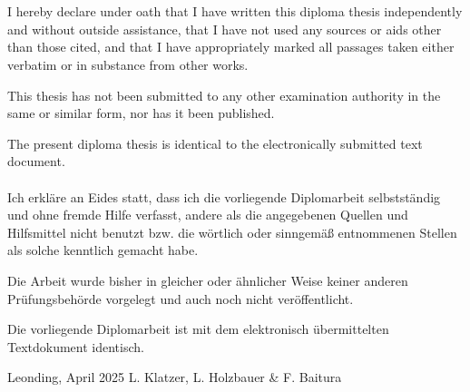 \thispagestyle{empty}
\vspace{3cm}
~ \\ \\
I hereby declare under oath that I have written this diploma thesis independently and without outside assistance, that I have not used any sources or aids other than those cited, and that I have appropriately marked all passages taken either verbatim or in substance from other works.

This thesis has not been submitted to any other examination authority in the same or similar form, nor has it been published.

The present diploma thesis is identical to the electronically submitted text document.
\vspace{1cm}
~ \\ \\
Ich erkläre an Eides statt, dass ich die vorliegende Diplomarbeit selbstständig und ohne fremde Hilfe verfasst, andere als die angegebenen Quellen und Hilfsmittel nicht benutzt bzw. die wörtlich oder sinngemäß entnommenen Stellen als solche kenntlich gemacht habe.

Die Arbeit wurde bisher in gleicher oder ähnlicher Weise keiner anderen Prüfungsbehörde vorgelegt und auch noch nicht veröffentlicht.

Die vorliegende Diplomarbeit ist mit dem elektronisch übermittelten Textdokument identisch.
\vspace{3cm}
\begin{tabbing}
	Leonding, April 2025 \hspace{5cm} L. Klatzer, L. Holzbauer \& F. Baitura
\end{tabbing}
\vspace{5cm}
\newpage
\setcounter{page}{1}
